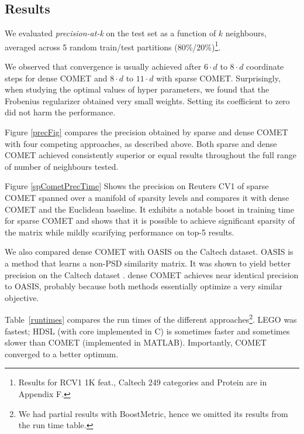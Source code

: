 \documentclass[twoside,11pt]{article}
\newcommand{\ignore}[1]{}
\newcommand{\tabref}[1]{Table~\ref{#1}}
\begin{document}
\subsection{Results}
We evaluated \textit{precision-at-k} on the test set as a function of $k$ neighbours, averaged across 5 random train/test partitions (80\%/20\%)\footnote{Results for RCV1 1K feat., Caltech 249 categories and Protein are in Appendix F.}.
\ignore{Figure \ref{cometConvergeFig} shows the \textit{precision-at-k} over the test sets as it progresses during learning. 
}
We observed that convergence is usually achieved after $6 \cdot d$ to $8 \cdot d$ coordinate steps for dense COMET and $8 \cdot d$ to $11 \cdot d$ with sparse COMET.
Surprisingly, when studying the optimal values of hyper parameters, we found that the Frobenius regularizer obtained very small weights. Setting its coefficient to zero did not harm the performance. 

Figure \ref{precFig} compares the precision obtained by sparse and dense COMET with four competing approaches, as described above. Both sparse and dense COMET achieved consistently superior or equal results throughout the full range of number of neighbours tested.

Figure \ref{spCometPrecTime} Shows the precision on Reuters CV1 of sparse COMET spanned over a manifold of sparsity levels and compares it with dense COMET and the Euclidean baseline. It exhibits a notable boost in training time for sparse COMET and shows that it is possible to achieve significant sparsity of the matrix while mildly scarifying performance on top-5 results.

We also compared dense COMET with OASIS on the Caltech dataset. OASIS is a method that learns a non-PSD similarity matrix. It was shown to yield better precision on the Caltech dataset \citep{OASIS}. dense COMET achieves near identical precision to OASIS, probably because both methods essentially optimize a very similar objective.


\tabref{runtimes} compares the run times of the different approaches\footnote{We had partial results with BoostMetric, hence we omitted its results from the run time table.}. LEGO was fastest; HDSL (with core implemented in C) is sometimes faster and sometimes slower than COMET (implemented in MATLAB). Importantly, COMET converged to a better optimum.
\end{document}
